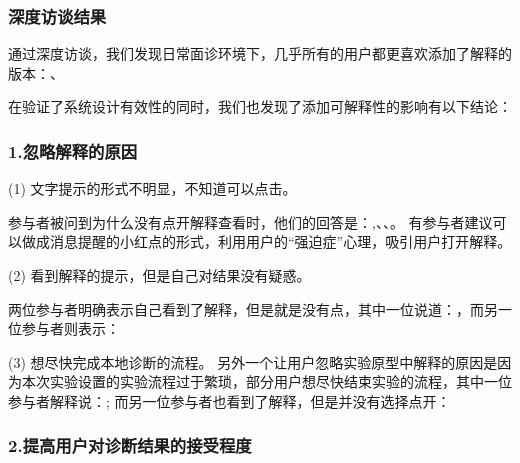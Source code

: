 




\subsubsection{深度访谈结果}



通过深度访谈，我们发现日常面诊环境下，几乎所有的用户都更喜欢添加了解释的版本：、

在验证了系统设计有效性的同时，我们也发现了添加可解释性的影响有以下结论：

\subsubsection{1.忽略解释的原因}
(1) 文字提示的形式不明显，不知道可以点击。

参与者被问到为什么没有点开解释查看时，他们的回答是：,、、。
有参与者建议可以做成消息提醒的小红点的形式，利用用户的“强迫症”心理，吸引用户打开解释。

(2) 看到解释的提示，但是自己对结果没有疑惑。

两位参与者明确表示自己看到了解释，但是就是没有点，其中一位说道：，而另一位参与者则表示：


(3) 想尽快完成本地诊断的流程。
 另外一个让用户忽略实验原型中解释的原因是因为本次实验设置的实验流程过于繁琐，部分用户想尽快结束实验的流程，其中一位参与者解释说：;
 而另一位参与者也看到了解释，但是并没有选择点开：

\subsubsection{2.提高用户对诊断结果的接受程度}

